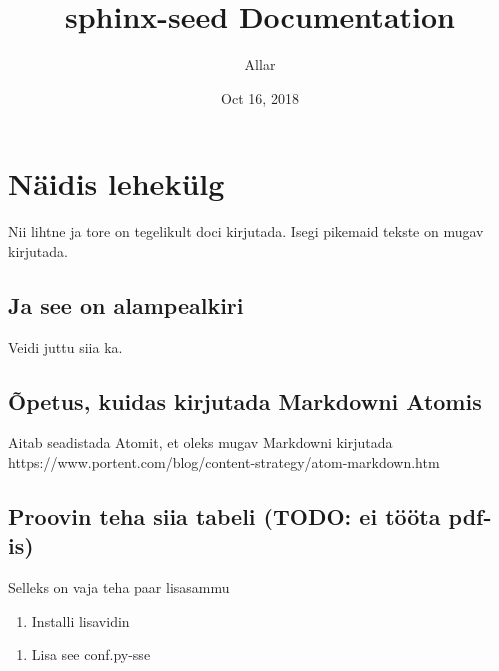 \documentclass[letterpaper,10pt,english]{sphinxmanual}
\title{sphinx-seed Documentation}
\date{Oct 16, 2018}
\author{Allar}
\begin{document}
\maketitle
\sphinxtableofcontents
{}\label{\detokenize{index::doc}}



\chapter{Näidis lehekülg}
\label{\detokenize{samplepage:simple-documentation}}\label{\detokenize{samplepage::doc}}\label{\detokenize{samplepage:naidis-lehekulg}}
Nii lihtne ja tore on tegelikult doci kirjutada. Isegi pikemaid tekste on mugav kirjutada.


\section{Ja see on alampealkiri}
\label{\detokenize{samplepage:ja-see-on-alampealkiri}}
Veidi juttu siia ka.


\section{Õpetus, kuidas kirjutada Markdowni Atomis}
\label{\detokenize{samplepage:opetus-kuidas-kirjutada-markdowni-atomis}}
Aitab seadistada Atomit, et oleks mugav Markdowni kirjutada
https://www.portent.com/blog/content-strategy/atom-markdown.htm


\section{Proovin teha siia tabeli (TODO: ei tööta pdf-is)}
\label{\detokenize{samplepage:proovin-teha-siia-tabeli-todo-ei-toota-pdf-is}}
Selleks on vaja teha paar lisasammu
\begin{enumerate}
\item {} 
Installi lisavidin

\end{enumerate}

\begin{enumerate}
\item {} 
Lisa see conf.py-sse

\end{enumerate}

%
\begin{sphinxVerbatim}[commandchars=\\\{\}]
  \PYG{p}{[}
\PYG{p}{]}
\end{sphinxVerbatim}
\end{document}
